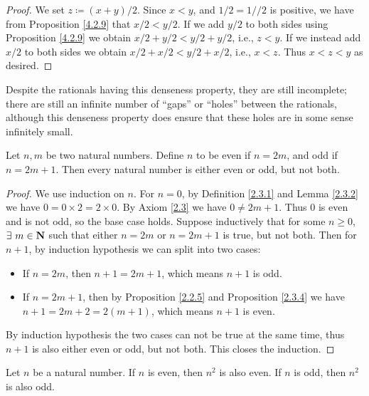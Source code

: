 \begin{proof}
    We set \(z \coloneqq (x + y) / 2\).
    Since \(x < y\), and \(1 / 2 = 1 // 2\) is positive, we have from Proposition \ref{4.2.9} that \(x / 2 < y / 2\).
    If we add \(y / 2\) to both sides using Proposition \ref{4.2.9} we obtain \(x / 2 + y / 2 < y / 2 + y / 2\), i.e., \(z < y\).
    If we instead add \(x / 2\) to both sides we obtain \(x / 2 + x / 2 < y / 2 + x / 2\), i.e., \(x < z\).
    Thus \(x < z < y\) as desired.
\end{proof}

\begin{note}
    Despite the rationals having this denseness property, they are still incomplete;
    there are still an infinite number of ``gaps'' or ``holes'' between the rationals, although this denseness property does ensure that these holes are in some sense infinitely small.
\end{note}

\begin{additional corollary}\label{ac 4.4.2}
Let \(n, m\) be two natural numbers.
Define \(n\) to be even if \(n = 2m\), and odd if \(n = 2m + 1\).
Then every natural number is either even or odd, but not both.
\end{additional corollary}

\begin{proof}
    We use induction on \(n\).
    For \(n = 0\), by Definition \ref{2.3.1} and Lemma \ref{2.3.2} we have \(0 = 0 \times 2 = 2 \times 0\).
    By Axiom \ref{2.3} we have \(0 \neq 2m + 1\).
    Thus \(0\) is even and is not odd, so the base case holds.
    Suppose inductively that for some \(n \geq 0\), \(\exists\ m \in \mathbf{N}\) such that either \(n = 2m\) or \(n = 2m + 1\) is true, but not both.
    Then for \(n + 1\), by induction hypothesis we can split into two cases:
    \begin{itemize}
        \item If \(n = 2m\), then \(n + 1 = 2m + 1\), which means \(n + 1\) is odd.
        \item If \(n = 2m + 1\), then by Proposition \ref{2.2.5} and Proposition \ref{2.3.4} we have \(n + 1 = 2m + 2 = 2(m + 1)\), which means \(n + 1\) is even.
    \end{itemize}
    By induction hypothesis the two cases can not be true at the same time, thus \(n + 1\) is also either even or odd, but not both.
    This closes the induction.
\end{proof}

\begin{additional corollary}\label{ac 4.4.3}
Let \(n\) be a natural number.
If \(n\) is even, then \(n^2\) is also even.
If \(n\) is odd, then \(n^2\) is also odd.
\end{additional corollary}

